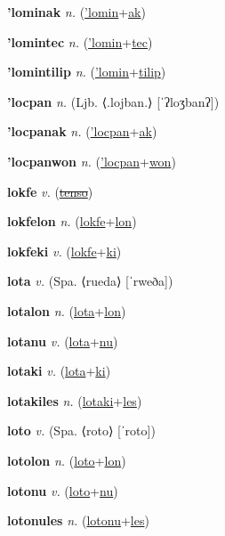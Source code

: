\textbf{\hypertarget{'lominak}{'lominak}} \textit{n.} (\hyperlink{'lomin}{'lomin}+\allowbreak \hyperlink{ak}{ak})


\textbf{\hypertarget{'lomintec}{'lomintec}} \textit{n.} (\hyperlink{'lomin}{'lomin}+\allowbreak \hyperlink{tec}{tec})


\textbf{\hypertarget{'lomintilip}{'lomintilip}} \textit{n.} (\hyperlink{'lomin}{'lomin}+\allowbreak \hyperlink{tilip}{tilip})


\textbf{\hypertarget{'locpan}{'locpan}} \textit{n.} (Ljb. ⟨.lojban.⟩ [ˈʔloʒbanʔ])


\textbf{\hypertarget{'locpanak}{'locpanak}} \textit{n.} (\hyperlink{'locpan}{'locpan}+\allowbreak \hyperlink{ak}{ak})


\textbf{\hypertarget{'locpanwon}{'locpanwon}} \textit{n.} (\hyperlink{'locpan}{'locpan}+\allowbreak \hyperlink{won}{won})


\textbf{\hypertarget{lokfe}{lokfe}} \textit{v.} (\hyperlink{tenso}{\sout{tenso}})


\textbf{\hypertarget{lokfelon}{lokfelon}} \textit{n.} (\hyperlink{lokfe}{lokfe}+\allowbreak \hyperlink{lon}{lon})


\textbf{\hypertarget{lokfeki}{lokfeki}} \textit{v.} (\hyperlink{lokfe}{lokfe}+\allowbreak \hyperlink{ki}{ki})


\textbf{\hypertarget{lota}{lota}} \textit{v.} (Spa. ⟨rueda⟩ [ˈrweða])


\textbf{\hypertarget{lotalon}{lotalon}} \textit{n.} (\hyperlink{lota}{lota}+\allowbreak \hyperlink{lon}{lon})


\textbf{\hypertarget{lotanu}{lotanu}} \textit{v.} (\hyperlink{lota}{lota}+\allowbreak \hyperlink{nu}{nu})


\textbf{\hypertarget{lotaki}{lotaki}} \textit{v.} (\hyperlink{lota}{lota}+\allowbreak \hyperlink{ki}{ki})


\textbf{\hypertarget{lotakiles}{lotakiles}} \textit{n.} (\hyperlink{lotaki}{lotaki}+\allowbreak \hyperlink{les}{les})


\textbf{\hypertarget{loto}{loto}} \textit{v.} (Spa. ⟨roto⟩ [ˈroto])


\textbf{\hypertarget{lotolon}{lotolon}} \textit{n.} (\hyperlink{loto}{loto}+\allowbreak \hyperlink{lon}{lon})


\textbf{\hypertarget{lotonu}{lotonu}} \textit{v.} (\hyperlink{loto}{loto}+\allowbreak \hyperlink{nu}{nu})


\textbf{\hypertarget{lotonules}{lotonules}} \textit{n.} (\hyperlink{lotonu}{lotonu}+\allowbreak \hyperlink{les}{les})


